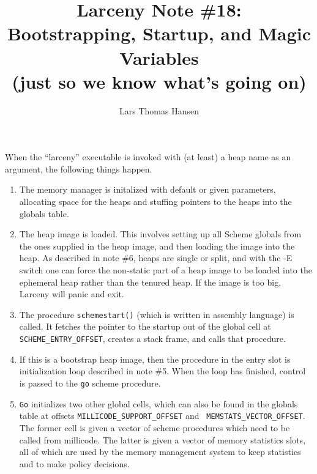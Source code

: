 
\title{Larceny Note \#18: \\
       Bootstrapping, Startup, and Magic Variables \\
       {\tenrm (just so we know what's going on)}}
\author{Lars Thomas Hansen}


\maketitle

When the ``larceny'' executable is invoked with (at least) a heap name as
an argument, the following things happen.

\begin{enumerate}

\item
The memory manager is initalized with default or given parameters, allocating
space for the heaps and stuffing pointers to the heaps into the globals table.

\item 
The heap image is loaded. This involves setting up all Scheme globals from the
ones supplied in the heap image, and then loading the image into the heap.
As described in note \#6, heaps are single or split, and with the -E switch
one can force the non-static part of a heap image to be loaded into the 
ephemeral heap rather than the tenured heap. If the image is too big, Larceny
will panic and exit.

\item
The procedure {\tt schemestart()} (which is written in assembly language) is
called. It fetches the pointer to the startup out of the global cell at {\tt
SCHEME\_ENTRY\_OFFSET}, creates a stack frame, and calls that procedure.

\item
If this is a bootstrap heap image, then the procedure in the entry slot is
initialization loop described in note \#5. When the loop has finished,
control is passed to the {\tt go} scheme procedure.

\item
{\tt Go} initializes two other global cells, which can also be found in the
globals table at offsets {\tt MILLICODE\_SUPPORT\_OFFSET} and {\tt
MEMSTATS\_VECTOR\_OFFSET}. The former cell is given a vector of scheme
procedures which need to be called from millicode. The latter is given a
vector of memory statistics slots, all of which are used by the memory
management system to keep statistics and to make policy decisions.

\end{enumerate}

